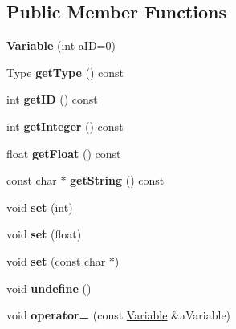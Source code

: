 \subsection*{Public Member Functions}
\begin{DoxyCompactItemize}
\item 
\hypertarget{a00027_a85762c842cb279744763a3d987d0220a}{{\bfseries Variable} (int a\+I\+D=0)}\label{a00027_a85762c842cb279744763a3d987d0220a}

\item 
\hypertarget{a00027_a5a4ba3b52af5668064d2cc4a14dfbd39}{Type {\bfseries get\+Type} () const }\label{a00027_a5a4ba3b52af5668064d2cc4a14dfbd39}

\item 
\hypertarget{a00027_add84de4a866b07c8ce12d5ba437c1177}{int {\bfseries get\+I\+D} () const }\label{a00027_add84de4a866b07c8ce12d5ba437c1177}

\item 
\hypertarget{a00027_a96541cad47a888a3faf5ac95ebb642c1}{int {\bfseries get\+Integer} () const }\label{a00027_a96541cad47a888a3faf5ac95ebb642c1}

\item 
\hypertarget{a00027_accd18c593f68e10f4960d3f2da4cef3e}{float {\bfseries get\+Float} () const }\label{a00027_accd18c593f68e10f4960d3f2da4cef3e}

\item 
\hypertarget{a00027_a8d777ed20b189d668564586e08794a3b}{const char $\ast$ {\bfseries get\+String} () const }\label{a00027_a8d777ed20b189d668564586e08794a3b}

\item 
\hypertarget{a00027_ade1810d281d0573dc61aa40b2a26bd4f}{void {\bfseries set} (int)}\label{a00027_ade1810d281d0573dc61aa40b2a26bd4f}

\item 
\hypertarget{a00027_a2f1bafa54a211691509471177b054ec4}{void {\bfseries set} (float)}\label{a00027_a2f1bafa54a211691509471177b054ec4}

\item 
\hypertarget{a00027_a70c43bd069987bc4bebd9b586c6688f2}{void {\bfseries set} (const char $\ast$)}\label{a00027_a70c43bd069987bc4bebd9b586c6688f2}

\item 
\hypertarget{a00027_a89d980fdc6a07075624598e58a9ee420}{void {\bfseries undefine} ()}\label{a00027_a89d980fdc6a07075624598e58a9ee420}

\item 
\hypertarget{a00027_afe7599538dad80403536f47710588b0f}{void {\bfseries operator=} (const \hyperlink{a00027}{Variable} \&a\+Variable)}\label{a00027_afe7599538dad80403536f47710588b0f}


\end{DoxyCompactItemize}

